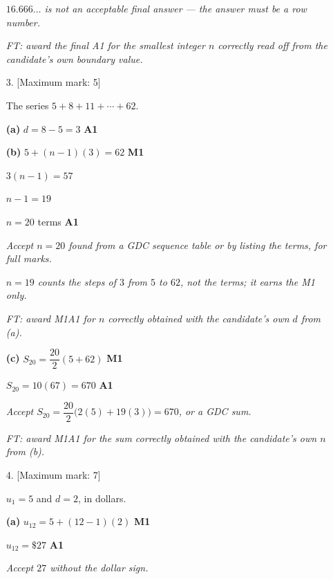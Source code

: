 \documentclass[12pt, twoside]{article}
\begin{document}
\begin{enumerate}[itemsep=0.3cm]
\emph{$16.666\ldots$ is not an acceptable final answer --- the answer
must be a row number.}

\emph{FT: award the final A1 for the smallest integer $n$ correctly
read off from the candidate's own boundary value.}

\newpage

\item[3.] [Maximum mark: 5]

The series $5 + 8 + 11 + \cdots + 62$.

\medskip

\textbf{(a)} $d = 8 - 5 = 3$ \hfill \textbf{A1}

\medskip

\textbf{(b)} $5 + (n - 1)(3) = 62$ \hfill \textbf{M1}

$3(n - 1) = 57$

$n - 1 = 19$

$n = 20$ terms \hfill \textbf{A1}

\emph{Accept $n = 20$ found from a GDC sequence table or by listing the
terms, for full marks.}

\emph{$n = 19$ counts the steps of $3$ from $5$ to $62$, not the terms;
it earns the M1 only.}

\emph{FT: award M1A1 for $n$ correctly obtained with the candidate's own
$d$ from (a).}

\medskip

\textbf{(c)} $S_{20} = \dfrac{20}{2}(5 + 62)$ \hfill \textbf{M1}

$S_{20} = 10(67) = 670$ \hfill \textbf{A1}

\emph{Accept $S_{20} = \dfrac{20}{2}\bigl(2(5) + 19(3)\bigr) = 670$, or a
GDC sum.}

\emph{FT: award M1A1 for the sum correctly obtained with the candidate's
own $n$ from (b).}

\newpage

\item[4.] [Maximum mark: 7]

$u_{1} = 5$ and $d = 2$, in dollars.

\medskip

\textbf{(a)} $u_{12} = 5 + (12 - 1)(2)$ \hfill \textbf{M1}

$u_{12} = \$27$ \hfill \textbf{A1}

\emph{Accept $27$ without the dollar sign.}


\end{enumerate}
\end{document}
